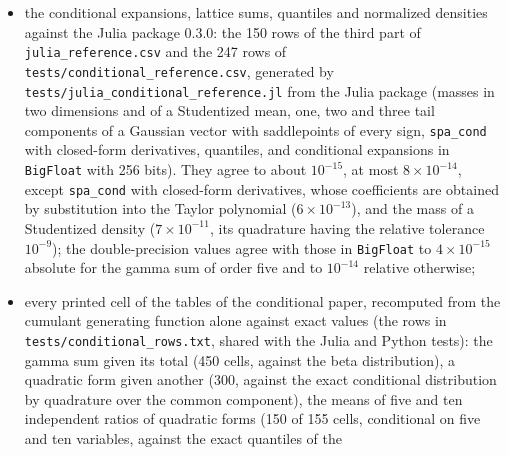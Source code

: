 \documentclass[11pt]{article}
\newcommand{\prog}[1]{\texttt{#1}}
\begin{document}
\begin{itemize}
double-double against the Julia package in \prog{BigFloat} with 256 bits
(\prog{tests/studentized\_reference.csv}, generated by \prog{tests/julia\_studentized\_reference.jl}):
the density of orders one to six and the distribution function with every half-order up to order
four, for the noncentral $t$ at $q=0.5$ and the Dickey--Fuller model under a local alternative, agree
to the last digit of double precision, and the refined density of the Dickey--Fuller model 2 to
$10^{-15}$ at order five. Over all the reference values (the noncentral $t$ at $q=0.5,1.5,2.5$ and
the three Dickey--Fuller models), double-double agrees to the last digit except the density of
model 2 at order five ($10^{-15}$) and order six ($4\times10^{-10}$, $\kappa\approx10^{23}$); for that
model double precision has errors of $2\times10^{-9}$ at order three and gives no correct digit at
order six;
\item the conditional expansions, lattice sums, quantiles and normalized densities against the Julia
package 0.3.0: the 150 rows of the third part of \prog{julia\_reference.csv} and the 247 rows of
\prog{tests/conditional\_reference.csv}, generated by \prog{tests/julia\_conditional\_reference.jl}
from the Julia package (masses in two dimensions and of a Studentized mean, one, two and three tail
components of a Gaussian vector with saddlepoints of every sign, \prog{spa\_cond} with closed-form
derivatives, quantiles, and conditional expansions in \prog{BigFloat} with 256 bits). They agree to
about $10^{-15}$, at most $8\times10^{-14}$, except \prog{spa\_cond} with closed-form derivatives,
whose coefficients are obtained by substitution into the Taylor polynomial ($6\times10^{-13}$), and
the mass of a Studentized density ($7\times10^{-11}$, its quadrature having the relative tolerance
$10^{-9}$); the double-precision values agree with those in \prog{BigFloat} to $4\times10^{-15}$
absolute for the gamma sum of order five and to $10^{-14}$ relative otherwise;
\item every printed cell of the tables of the conditional paper, recomputed from the cumulant
generating function alone against exact values (the rows in \prog{tests/conditional\_rows.txt},
shared with the Julia and Python tests): the gamma sum given its total (450 cells, against the beta
distribution), a quadratic form given another (300, against the exact conditional distribution by
quadrature over the common component), the means of five and ten independent ratios of quadratic
forms (150 of 155 cells, conditional on five and ten variables, against the exact quantiles of the

\end{itemize}
\end{document}
